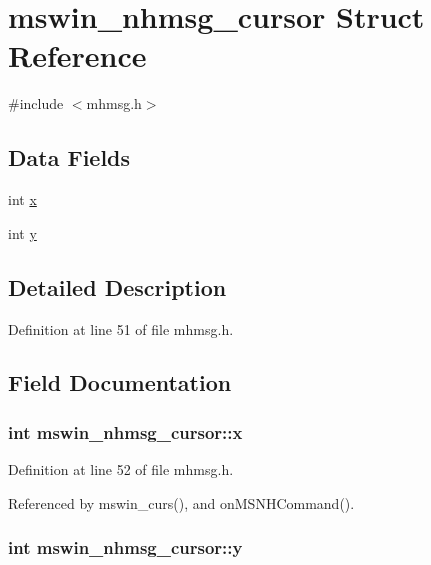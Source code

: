\hypertarget{structmswin__nhmsg__cursor}{\section{mswin\+\_\+nhmsg\+\_\+cursor Struct Reference}
\label{structmswin__nhmsg__cursor}
}


{\ttfamily \#include $<$mhmsg.\+h$>$}

\subsection*{Data Fields}
\begin{DoxyCompactItemize}
\item 
int \hyperlink{structmswin__nhmsg__cursor_a1bb0698246733cc297b66a312b33e743}{x}
\item 
int \hyperlink{structmswin__nhmsg__cursor_a4ecc187448dc2dbd8806212e5f7a4a16}{y}
\end{DoxyCompactItemize}


\subsection{Detailed Description}


Definition at line 51 of file mhmsg.\+h.



\subsection{Field Documentation}
\hypertarget{structmswin__nhmsg__cursor_a1bb0698246733cc297b66a312b33e743}{
\subsubsection[{x}]{\setlength{\rightskip}{0pt plus 5cm}int mswin\+\_\+nhmsg\+\_\+cursor\+::x}}\label{structmswin__nhmsg__cursor_a1bb0698246733cc297b66a312b33e743}


Definition at line 52 of file mhmsg.\+h.



Referenced by mswin\+\_\+curs(), and on\+M\+S\+N\+H\+Command().

\hypertarget{structmswin__nhmsg__cursor_a4ecc187448dc2dbd8806212e5f7a4a16}{
\subsubsection[{y}]{\setlength{\rightskip}{0pt plus 5cm}int mswin\+\_\+nhmsg\+\_\+cursor\+::y}}\label{structmswin__nhmsg__cursor_a4ecc187448dc2dbd8806212e5f7a4a16}


